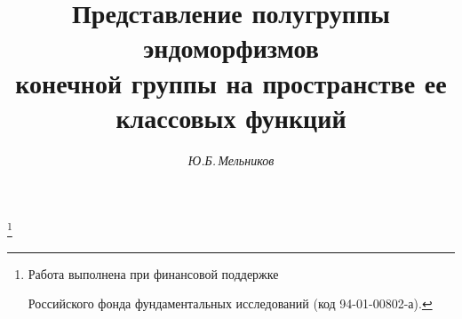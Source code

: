 




% 





\newcommand{\Irr}{\operatorname{Irr}}


\newcommand{\Inn}{\operatorname{Inn}}


\newcommand{\Ker}{\operatorname{Ker}}


\newcommand{\tts}[1]{}







 


\setcounter{page}{64}












\author{\it Ю.Б.\,Мельников }




\title{Представление полугруппы эндоморфизмов\\


конечной группы на пространстве ее классовых функций}





\thanks{Работа выполнена при финансовой поддержке


Российского фонда фундаментальных исследований (код 94-01-00802-а).}


\date{}







\pagestyle{plain} %









